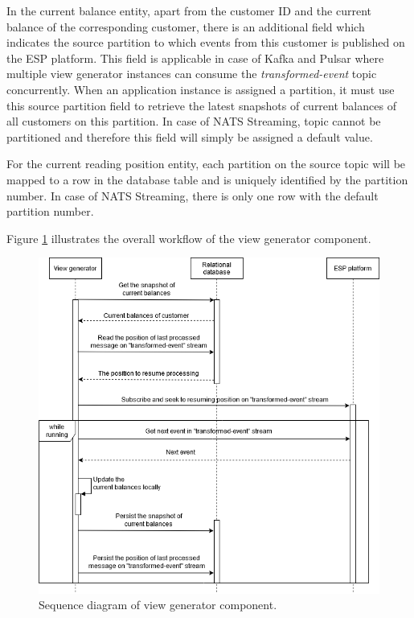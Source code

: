  

In the current balance entity, apart from the customer ID and the current balance of the corresponding customer, there is an additional field which indicates the source partition to which events from this customer is published on the ESP platform. This field is applicable in case of Kafka and Pulsar where multiple view generator instances can consume the \emph{transformed-event} topic concurrently. When an application instance is assigned a partition, it must use this source partition field to retrieve the latest snapshots of current balances of all customers on this partition. In case of NATS Streaming, topic cannot be partitioned and therefore this field will simply be assigned a default value. 


 
For the current reading position entity, each partition on the source topic will be mapped to a row in the database table and is uniquely identified by the partition number. In case of NATS Streaming, there is only one row with the default partition number. 


Figure \ref{fig:implementviewgenerator} illustrates the overall workflow of the view generator component.
\newpage
\begin{figure}[h]
	\centering
	\includegraphics[width=\linewidth]{images/implement-view-generator.png}
	\caption{Sequence diagram of view generator component.}
	\label{fig:implementviewgenerator}
\end{figure}

